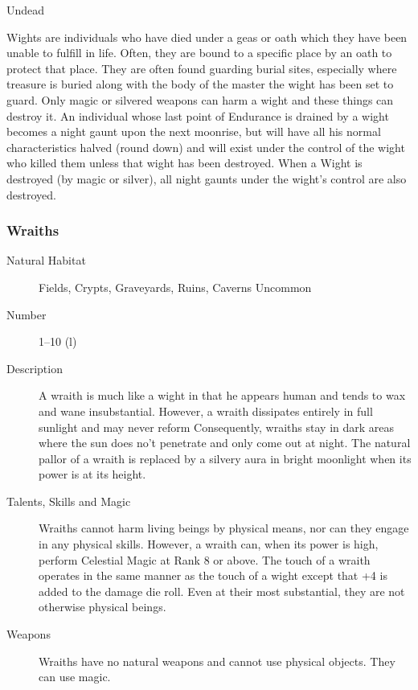 \begin{mmgroup}{Undead}
\begin{mmcomment}
 Wights are individuals who have died under a geas or oath
which they have been unable to fulfill in life. Often, they are bound
to a specific place by an oath to protect that place. They are often
found guarding burial sites, especially where treasure is buried along
with the body of the master the wight has been set to guard. Only
magic or silvered weapons can harm a wight and these things can
destroy it. An individual whose last point of Endurance is drained by
a wight becomes a night gaunt upon the next moonrise, but will have
all his normal characteristics halved (round down) and will exist
under the control of the wight who killed them unless that wight has
been destroyed. When a Wight is destroyed (by magic or silver), all
night gaunts under the wight's control are also destroyed.

\end{mmcomment}

\subsubsection{Wraiths}

\begin{description}
\item[Natural Habitat] Fields, Crypts, Graveyards, Ruins, Caverns Uncommon

\item[Number] 1–10 (l)


\item[Description] A wraith is much like a wight in that he appears human
and tends to wax and wane insubstantial. However, a wraith dissipates
entirely in full sunlight and may never reform Consequently, wraiths
stay in dark areas where the sun does no't penetrate and only come out
at night. The natural pallor of a wraith is replaced by a silvery aura
in bright moonlight when its power is at its height.

\item[Talents, Skills and Magic] Wraiths cannot harm living beings by physical means, nor can
they engage in any physical skills.  However, a wraith can, when its
power is high, perform Celestial Magic at Rank 8 or above. The touch
of a wraith operates in the same manner as the touch of a wight except
that +4 is added to the damage die roll. Even at their most
substantial, they are not otherwise physical beings.

\item[Weapons] Wraiths have no natural weapons and cannot use physical
objects. They can use magic.


\end{description}
\end{mmgroup}
